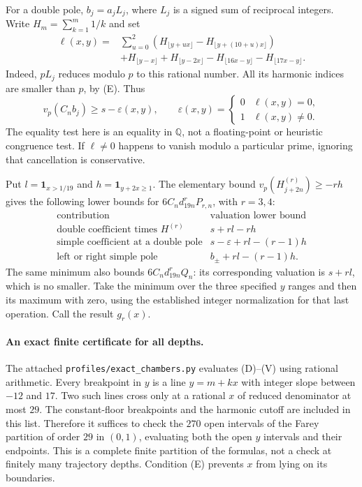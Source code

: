 \documentclass[11pt]{article}
\begin{document}
For a double pole, $b_j=a_jL_j$, where $L_j$ is a signed sum of reciprocal
integers. Write $H_m=\sum_{k=1}^m1/k$ and set
\begin{align*}
 \ell(x,y)={}&\sum_{u=0}^2\left(H_{\lfloor y+ux\rfloor}
                           -H_{\lfloor y+(10+u)x\rfloor}\right)\\
 &+H_{\lfloor y-x\rfloor}+H_{\lfloor y-2x\rfloor}
  -H_{\lfloor16x-y\rfloor}-H_{\lfloor17x-y\rfloor}.
\end{align*}
Indeed, $pL_j$ reduces modulo $p$ to this rational number. All its
harmonic indices are smaller than $p$, by (E). Thus
\[
 v_p(C_nb_j)\ge s-\varepsilon(x,y),\qquad
 \varepsilon(x,y)=\begin{cases}0&\ell(x,y)=0,\\1&\ell(x,y)\ne0.\end{cases}
 \tag{LD}
\]
The equality test here is an equality in $\mathbb Q$, not a floating-point
or heuristic congruence test. If $\ell\ne0$ happens to vanish modulo a
particular prime, ignoring that cancellation is conservative.

Put $l=\mathbf1_{x>1/19}$ and $h=\mathbf1_{y+2x\ge1}$. The elementary
bound $v_p(H_{j+2n}^{(r)})\ge-rh$ gives the following lower bounds for
$6C_nd_{19n}^{r}P_{r,n}$, with $r=3,4$:
\[
 \begin{array}{c|c}
 \text{contribution}&\text{valuation lower bound}\\\hline
 \text{double coefficient times }H^{(r)}&s+rl-rh\\
 \text{simple coefficient at a double pole}&s-\varepsilon+rl-(r-1)h\\
 \text{left or right simple pole}&b_\pm+rl-(r-1)h.
 \end{array}
 \tag{V}
\]
The same minimum also bounds $6C_nd_{19n}^rQ_n$: its corresponding
valuation is $s+rl$, which is no smaller. Take the minimum over the three
specified $y$ ranges and then its maximum with zero, using the established
integer normalization for that last operation. Call the result $g_r(x)$.

\paragraph{An exact finite certificate for all depths.}
The attached \texttt{profiles/exact\_chambers.py} evaluates (D)--(V)
using rational arithmetic. Every breakpoint in $y$ is a line $y=m+kx$
with integer slope between $-12$ and $17$. Two such lines cross only at
a rational $x$ of reduced denominator at most $29$. The constant-floor
breakpoints and the harmonic cutoff are included in this list. Therefore
it suffices to check the $270$ open intervals of the Farey partition of
order $29$ in $(0,1)$, evaluating both the open $y$ intervals and their
endpoints. This is a complete finite partition of the formulas, not a
check at finitely many trajectory depths. Condition (E) prevents $x$ from
lying on its boundaries.
\end{document}
